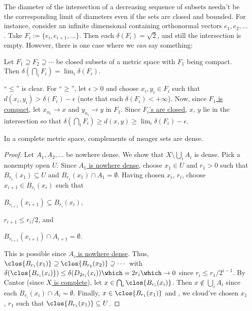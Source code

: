 	\begin{dgrs}
		The diameter of the intersection of a decreasing sequence of subsets needn't be the corresponding limit of diameters even if the sets are closed and bounded. For instance, consider an infinite dimensional \NLS containing orthonormal vectors $e_1, e_2, \ldots$. Take $F_i := \{e_i, e_{i + 1}, \ldots\}$. Then each $\delta(F_i) = \sqrt 2$, and still the intersection is empty. However, there is one case where we \emph{can} say something:
		
		\begin{prp}
			Let $F_1\supseteq F_2\supseteq\cdots$ be closed subsets of a metric space with $F_1$ being compact. Then $\delta(\bigcap_i F_i) = \lim_i\delta(F_i)$.
		\end{prp}
		
		\begin{dgrsProof}
			``$\le$'' is clear. For ``$\ge$'', let $\epsilon> 0$ and choose $x_i, y_i\in F_i$ such that $d(x_i, y_i) > \delta(F_i) - \epsilon$ (note that each $\delta(F_i) < +\infty$). Now, since \ul{$F_1$ is compact}, let $x_{n_i}\to x$ and $y_{n_i}\to y$ in $F_1$. Since \ul{$F_i$'s are closed}, $x$, $y$ lie in the intersection so that $\delta(\bigcap_i F_i)\ge d(x, y)\ge \lim_i\delta(F_i) - \epsilon$.
		\end{dgrsProof}
	\end{dgrs}
	
	\begin{thm}\label{THM: BCT}
		In a complete metric space, complements of meager sets are dense.
	\end{thm}
	
	\begin{proof}
		Let $A_1, A_2, \ldots$ be nowhere dense. We show that $X\setminus \bigcup_i A_i$ is dense. Pick a nonempty open $U$. Since \ul{$A_1$ is nowhere dense}, choose $x_1\in U$ and $r_1 > 0$ such that $B_{r_1}(x_1)\subseteq U$ and $B_{r_1}(x_1)\cap A_1 = \emptyset$. Having chosen
		$x_i$, $r_i$, choose $x_{i + 1}\in B_{r_i}(x_i)$ such that
		\begin{assmplist}
			\item $B_{r_{i + 1}}(x_{i + 1})\subseteq B_{r_i}(x_i)$,
			\item $r_{i + 1}\le r_i/2$, and
			\item $B_{r_{i + 1}}(x_{i + 1})\cap A_{i + 1} = \emptyset$.
		\end{assmplist}
		This is possible since \ul{$A_i$ is nowhere dense}.
		Thus, $\clos{B_{r_1}(x_1)}\supseteq\clos{B_{r_2}(x_2)}\supseteq\cdots$ with $\delta(\clos{B_{r_i}(x_i)})\le\delta(D_{2r_i}(x_i)) \which = 2r_i\which\to 0$ since $r_i\le r_1/2^{i - 1}$. By Cantor (since \ul{$X$ is complete}), let $x\in\bigcap_i\clos{B_{r_i}(x_i)}$. Then $x\notin \bigcup_i A_i$ since each $B_{r_i}(x_i)\cap A_i = \emptyset$. Finally, $x\in \clos{B_{r_1}(x_1)}$ and \wlogg, we cloud've chosen $x_1$, $r_1$ such that $\clos{B_{r_1}(x_1)}\subseteq U$.
	\end{proof}
	
